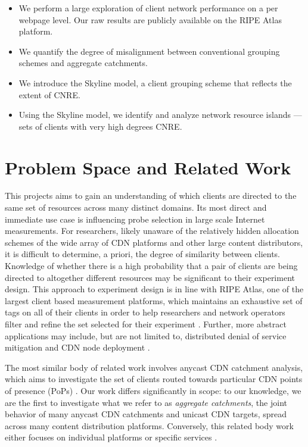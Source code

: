 \begin{itemize}%
    \item We perform a large exploration of client network performance on a per webpage level. Our
        raw results are publicly available on the RIPE Atlas platform.
    \item  We quantify the degree of misalignment between conventional grouping schemes
        and aggregate catchments.
    \item  We introduce the Skyline model, a client grouping scheme that reflects the
        extent of CNRE.
    \item  Using the Skyline model, we identify and analyze network resource islands --- 
        sets of clients with very high degrees CNRE. 
\end{itemize}

\section{Problem Space and Related Work} \label{skyspace}

This projects aims to gain an understanding of which clients are directed to the same set of
resources across many distinct domains. Its most direct and immediate use case is influencing probe
selection in large scale Internet measurements. For researchers, likely unaware of the relatively
hidden allocation schemes of the wide array of CDN platforms and other large content distributors,
it is difficult to determine, a priori, the degree of similarity between clients. Knowledge of
whether there is a high probability that a pair of clients are being directed to altogether
different resources may be significant to their experiment design. This approach to experiment
design is in line with RIPE Atlas, one of the largest client based measurement platforms,
which maintains
an exhaustive set of tags on all of their clients in order to help researchers and network operators
filter and refine the set selected for their experiment \cite{ripe-atlas}. Further, more abstract
applications may include, but are not limited to, distributed denial of service mitigation
\cite{anycastvsddos} and CDN node deployment \cite{35590, Tariq}.

The most similar body of related work involves anycast CDN catchment analysis, which aims to
investigate the set of clients routed towards particular CDN points of presence (PoPs)
\cite{Calder2015, anycastvsddos, vdmscatchment}. Our work differs significantly in scope: to our 
knowledge, we are the first to investigate what we refer to as \emph{aggregate catchments}, the joint
behavior of many anycast CDN catchments and unicast CDN targets, spread across many content
distribution platforms. Conversely, this related body work either focuses on individual platforms or
specific services \cite{Calder2015, anycastvsddos, vdmscatchment}. 

